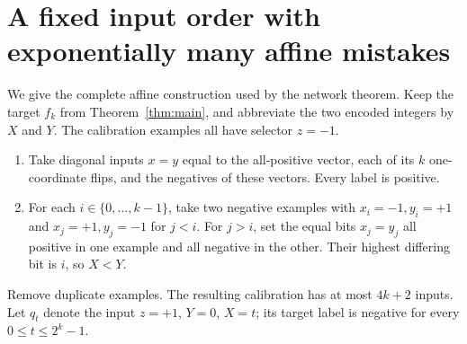 \section{A fixed input order with exponentially many affine mistakes}

We give the complete affine construction used by the network theorem.
Keep the target $f_k$ from Theorem~\ref{thm:main}, and abbreviate the two
encoded integers by $X$ and $Y$. The calibration examples all have
selector $z=-1$.
\begin{enumerate}
\item Take diagonal inputs $x=y$ equal to the all-positive vector,
each of its $k$ one-coordinate flips, and the negatives of these vectors.
Every label is positive.
\item For each $i\in\{0,\ldots,k-1\}$, take two negative examples with
$x_i=-1,y_i=+1$ and $x_j=+1,y_j=-1$ for $j<i$. For $j>i$, set the equal
bits $x_j=y_j$ all positive in one example and all negative in the other.
Their highest differing bit is $i$, so $X<Y$.
\end{enumerate}
Remove duplicate examples. The resulting calibration has at most $4k+2$
inputs. Let $q_t$ denote the input $z=+1$, $Y=0$, $X=t$; its target label
is negative for every $0\le t\le2^k-1$.

